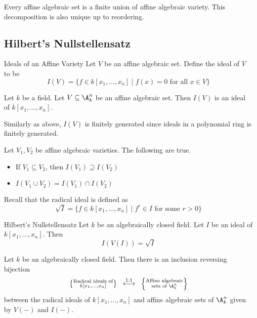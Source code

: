 \documentclass[a4paper]{article}
\begin{document}
\begin{prp}{}{} Every affine algebraic set is a finite union of affine algebraic variety. This decomposition is also unique up to reordering. 
\end{prp}

\subsection{Hilbert's Nullstellensatz}
\begin{defn}{Ideals of an Affine Variety}{} Let $V$ be an affine algebraic set. Define the ideal of $V$ to be $$I(V)=\{f\in k[x_1,\dots,x_n]\;|\;f(x)=0\text{ for all }x\in V\}$$ 
\end{defn}

\begin{lmm}{}{} Let $k$ be a field. Let $V\subseteq\A_k^n$ be an affine algebraic set. Then $I(V)$ is an ideal of $k[x_1,\dots,x_n]$. 
\end{lmm}

Similarly as above, $I(V)$ is finitely generated since ideals in a polynomial ring is finitely generated. 

\begin{prp}{}{} Let $V_1,V_2$ be affine algebraic varieties. The following are true. 
\begin{itemize}
\item If $V_1\subseteq V_2$, then $I(V_1)\supseteq I(V_2)$
\item $I(V_1\cup V_2)=I(V_1)\cap I(V_2)$
\end{itemize}
\end{prp}

Recall that the radical ideal is defined as $$\sqrt{I}=\{f\in k[x_1,\dots,x_n]\;|\;f^r\in I\text{ for some }r>0\}$$

\begin{thm}{Hilbert's Nullstellensatz}{} Let $k$ be an algebraically closed field. Let $I$ be an ideal of $k[x_1,\dots,x_n]$. Then $$I(V(I))=\sqrt{I}$$
\end{thm}

\begin{crl}{}{} Let $k$ be an algebraically closed field. Then there is an inclusion reversing bijection $$\left\{\substack{\text{Radical ideals of}\\ k[x_1,\dots,x_n]}\right\}\;\;\overset{\text{1:1}}{\longleftrightarrow}\;\;\left\{\substack{\text{Affine algebraic}\\\text{sets of }\A_k^n}\right\}$$ between the radical ideals of $k[x_1,\dots,x_n]$ and affine algebraic sets of $\A_k^n$ given by $V(-)$ and $I(-)$. 
\end{crl}
\end{document}
